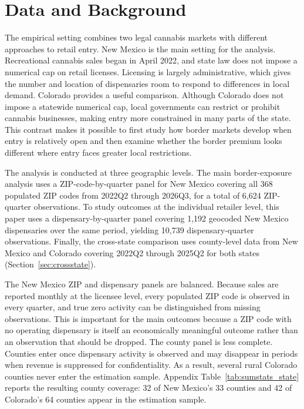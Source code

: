 \documentclass[english,12pt]{article}
\begin{document}
\section{Data and Background}
\label{sec:data}

The empirical setting combines two legal cannabis markets with different approaches to retail entry. New Mexico is the main setting for the analysis. Recreational cannabis sales began in April 2022, and state law does not impose a numerical cap on retail licenses. Licensing is largely administrative, which gives the number and location of dispensaries room to respond to differences in local demand. Colorado provides a useful comparison. Although Colorado does not impose a statewide numerical cap, local governments can restrict or prohibit cannabis businesses, making entry more constrained in many parts of the state. This contrast makes it possible to first study how border markets develop when entry is relatively open and then examine whether the border premium looks different where entry faces greater local restrictions.

The analysis is conducted at three geographic levels. The main border-exposure analysis uses a ZIP-code-by-quarter panel for New Mexico covering all 368 populated ZIP codes from 2022Q2 through 2026Q3, for a total of 6,624 ZIP-quarter observations. To study outcomes at the individual retailer level, this paper uses a dispensary-by-quarter panel covering 1,192 geocoded New Mexico dispensaries over the same period, yielding 10,739 dispensary-quarter observations. Finally, the cross-state comparison uses county-level data from New Mexico and Colorado covering 2022Q2 through 2025Q2 for both states (Section~\ref{sec:crossstate}).

The New Mexico ZIP and dispensary panels are balanced. Because sales are reported monthly at the licensee level, every populated ZIP code is observed in every quarter, and true zero activity can be distinguished from missing observations. This is important for the main outcomes because a ZIP code with no operating dispensary is itself an economically meaningful outcome rather than an observation that should be dropped. The county panel is less complete. Counties enter once dispensary activity is observed and may disappear in periods when revenue is suppressed for confidentiality. As a result, several rural Colorado counties never enter the estimation sample. Appendix Table~\ref{tab:sumstats_state} reports the resulting county coverage: 32 of New Mexico's 33 counties and 42 of Colorado's 64 counties appear in the estimation sample.
\end{document}
